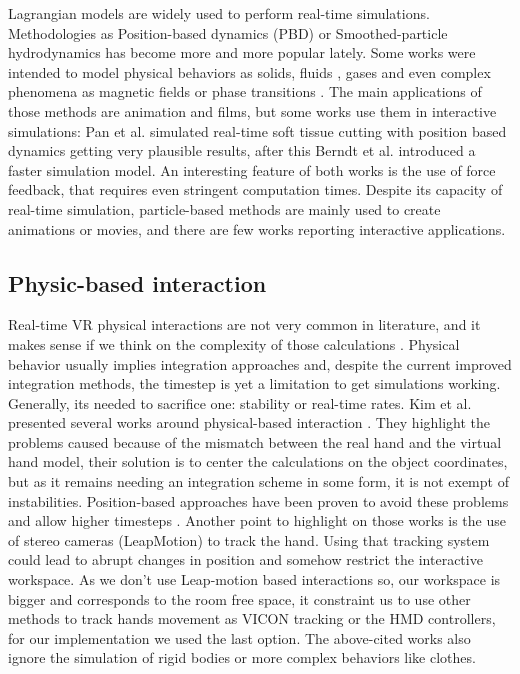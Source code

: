 \documentclass{vgtc}                          %
\begin{document}
Lagrangian models are widely used to perform real-time simulations. Methodologies as Position-based dynamics (PBD) \cite{Muller2007} or Smoothed-particle hydrodynamics has become more and more popular lately. Some works were intended to model physical behaviors as solids, fluids \cite{Macklin2013}, gases \cite{ren2016fast} and even complex phenomena as magnetic fields \cite{dolag1999sph} or phase transitions \cite{salazar2018heat}. The main applications of those methods are animation and films, but some works use them in interactive simulations: Pan et al. \cite{Pan2015real} simulated real-time soft tissue cutting with position based dynamics getting very plausible results, after this Berndt et al. \cite{berndt2017efficient} introduced a faster simulation model. An interesting feature of both works is the use of force feedback, that requires even stringent computation times. Despite its capacity of real-time simulation, particle-based methods are mainly used to create animations or movies, and there are few works reporting interactive applications.

\subsection{Physic-based interaction}

Real-time VR physical interactions are not very common in literature, and it makes sense if we think on the complexity of those calculations \cite{Holl2018}. Physical behavior usually implies integration approaches and, despite the current improved integration methods, the timestep is yet a limitation to get simulations working. Generally, its needed to sacrifice one: stability or real-time rates. Kim et al. presented several works around physical-based interaction \cite{Nasim2018, Kim2015, Nasim2016, Kim2016}. They highlight the problems caused because of the mismatch between the real hand and the virtual hand model, their solution is to center the calculations on the object coordinates, but as it remains needing an integration scheme in some form, it is not exempt of instabilities. Position-based approaches have been proven to avoid these problems and allow higher timesteps \cite{Macklin2014}.
Another point to highlight on those works is the use of stereo cameras (LeapMotion) to track the hand. Using that tracking system could lead to abrupt changes in position and somehow restrict the interactive workspace. As we don't use Leap-motion based interactions so, our workspace is bigger and corresponds to the room free space, it constraint us to use other methods to track hands movement as VICON tracking or the HMD controllers, for our implementation we used the last option. The above-cited works also ignore the simulation of rigid bodies or more complex behaviors like clothes.
\end{document}
